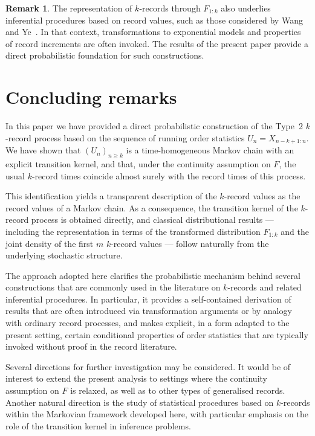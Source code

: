 \documentclass[12pt]{article}
\theoremstyle{definition}
\newtheorem{remark}[theorem]{Remark}
\begin{document}
\medskip

\begin{remark}
\label{rem:connection-Weibull}
The representation of $k$-records through $F_{1:k}$ also underlies inferential procedures based on record values, such as those considered by Wang and Ye~\cite{WangYe2015}. In that context, transformations to exponential models and properties of record increments are often invoked. The results of the present paper provide a direct probabilistic foundation for such constructions.
\end{remark}

\section{Concluding remarks}
\label{sec:conclusion}

In this paper we have provided a direct probabilistic construction of the Type~2 $k$-record process based on the sequence of running order statistics $U_n = X_{n-k+1:n}$. We have shown that $(U_n)_{n\ge k}$ is a time-homogeneous Markov chain with an explicit transition kernel, and that, under the continuity assumption on $F$, the usual $k$-record times coincide almost surely with the record times of this process.

This identification yields a transparent description of the $k$-record values as the record values of a Markov chain. As a consequence, the transition kernel of the $k$-record process is obtained directly, and classical distributional results — including the representation in terms of the transformed distribution $F_{1:k}$ and the joint density of the first $m$ $k$-record values — follow naturally from the underlying stochastic structure.

The approach adopted here clarifies the probabilistic mechanism behind several constructions that are commonly used in the literature on $k$-records and related inferential procedures. In particular, it provides a self-contained derivation of results that are often introduced via transformation arguments or by analogy with ordinary record processes, and makes explicit, in a form adapted to the present setting, certain conditional properties of order statistics that are typically invoked without proof in the record literature.

Several directions for further investigation may be considered. It would be of interest to extend the present analysis to settings where the continuity assumption on $F$ is relaxed, as well as to other types of generalised records. Another natural direction is the study of statistical procedures based on $k$-records within the Markovian framework developed here, with particular emphasis on the role of the transition kernel in inference problems.
\end{document}
